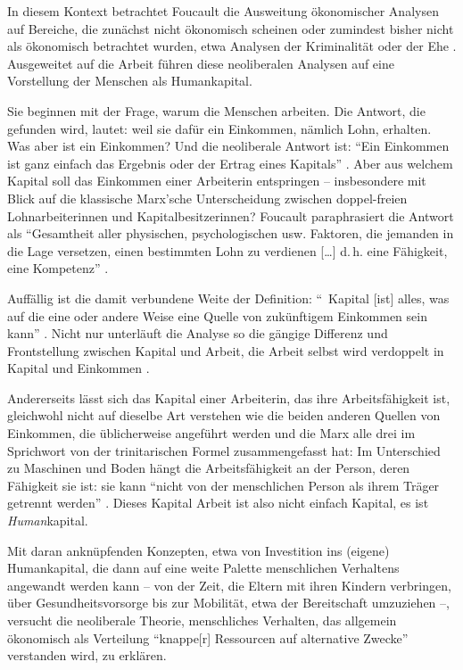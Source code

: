 \documentclass[12pt,
               DIV13,
               paper=a4,
               twoside=false,
               onehalfspacing,
               bibliography=totoc,
               toc=graduated,
               draft,
               ]{scrartcl}
\newcommand{\lips}{\dots\unkern}
\newcommand{\pc}[2]{\parencite[#1]{#2}}
\newcommand{\vgl}[2]{\parencite[vgl.][#1]{#2}}
\newcommand{\worries}[1]{\ifdraft{\textcolor{blue}{\texttt{(#1)}}}{}}
\begin{document}
In diesem Kontext betrachtet Foucault die Ausweitung ökonomischer
Analysen auf Bereiche, die zunächst nicht ökonomisch scheinen oder
zumindest bisher nicht als ökonomisch betrachtet wurden, etwa Analysen
der Kriminalität oder der Ehe \vgl{367}{gbp}. Ausgeweitet auf 
die Arbeit führen diese neoliberalen Analysen auf eine Vorstellung der
Menschen als Humankapital.

Sie beginnen mit der Frage, warum die Menschen arbeiten. Die Antwort,
die gefunden wird, lautet: weil sie dafür ein Einkommen, nämlich Lohn,
erhalten. Was aber ist ein Einkommen? Und die neoliberale Antwort ist:
"`Ein Einkommen ist ganz einfach das Ergebnis oder der Ertrag eines
Kapitals"' \pc{S. 311 f.}{gbp}. Aber aus welchem Kapital soll das
Einkommen einer Arbeiterin entspringen -- insbesondere mit Blick auf die
klassische Marx'sche Unterscheidung zwischen doppel-freien
Lohnarbeiterinnen und Kapitalbesitzerinnen? Foucault paraphrasiert die
Antwort als "`Gesamtheit aller physischen, psychologischen usw.
Faktoren, die jemanden in die Lage versetzen, einen bestimmten Lohn zu
verdienen [\lips] d.\,h. eine Fähigkeit, eine Kompetenz"' \pc{312}{gbp}.

Auffällig ist die damit verbundene Weite der Definition: "`\,\glq
Kapital\grq{} [ist] alles, was auf die eine oder andere Weise eine
Quelle von zukünftigem Einkommen sein kann"' \pc{312}{gbp}. Nicht nur
unterläuft die Analyse so die gängige Differenz und Frontstellung
zwischen Kapital und Arbeit, die Arbeit selbst wird verdoppelt in
Kapital und Einkommen \vgl{312}{gbp}.

Andererseits lässt sich das Kapital einer Arbeiterin, das ihre
Arbeitsfähigkeit ist, gleichwohl nicht auf dieselbe Art verstehen wie
die beiden anderen Quellen von Einkommen, die üblicherweise angeführt
werden und die Marx alle drei im Sprichwort von der trinitarischen
Formel \vgl{Kapitel 48, S. 822-839}{kap3} \worries{?} zusammengefasst
hat: Im Unterschied zu Maschinen und Boden hängt die Arbeitsfähigkeit
an der Person, deren Fähigkeit sie ist: sie kann "`nicht von der
menschlichen Person als ihrem Träger getrennt werden"' \pc{315}{gbp}.
Dieses Kapital Arbeit ist also nicht einfach Kapital, es ist
\emph{Human}kapital.

Mit daran anknüpfenden Konzepten, etwa von Investition ins (eigene)
Humankapital, die dann auf eine weite Palette menschlichen Verhaltens
angewandt werden kann -- von der Zeit, die Eltern mit ihren Kindern
verbringen, über Gesundheitsvorsorge bis zur Mobilität, etwa der
Bereitschaft umzuziehen \vgl{320}{gbp} --, versucht die neoliberale
Theorie, menschliches Verhalten, das allgemein ökonomisch als
Verteilung "`knappe[r] Ressourcen auf alternative Zwecke"'
\pc{310}{gbp} verstanden wird, zu erklären.
\end{document}

